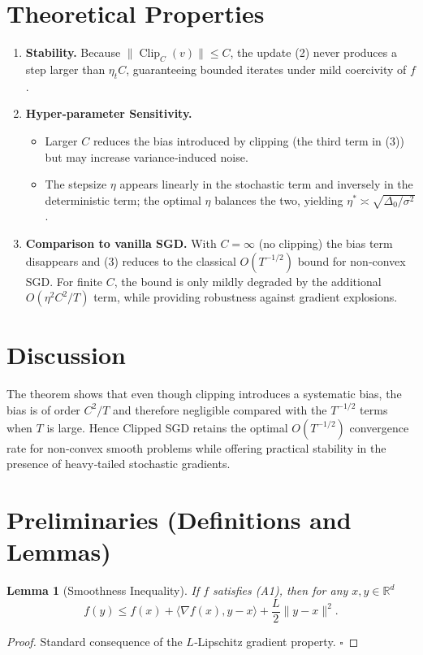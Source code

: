 \documentclass{article}
\newtheorem{lemma}{Lemma}
\newcommand{\R}{\mathbb{R}}
\begin{document}
\section*{Theoretical Properties}
\begin{enumerate}[label=\arabic*)]
\item \textbf{Stability.} Because $\|\operatorname{Clip}_{C}(v)\|\le C$, the update (2) never produces a step larger than $\eta_{t}C$, guaranteeing bounded iterates under mild coercivity of $f$.
\item \textbf{Hyper‑parameter Sensitivity.}
    \begin{itemize}
        \item Larger $C$ reduces the bias introduced by clipping (the third term in (3)) but may increase variance‑induced noise.
        \item The stepsize $\eta$ appears linearly in the stochastic term and inversely in the deterministic term; the optimal $\eta$ balances the two, yielding $\eta^{*}\asymp \sqrt{\Delta_{0}/\sigma^{2}}$.
    \end{itemize}
\item \textbf{Comparison to vanilla SGD.}
    With $C=\infty$ (no clipping) the bias term disappears and (3) reduces to the classical $O(T^{-1/2})$ bound for non‑convex SGD.  
    For finite $C$, the bound is only mildly degraded by the additional $O(\eta^{2}C^{2}/T)$ term, while providing robustness against gradient explosions.
\end{enumerate}

\section*{Discussion}
The theorem shows that even though clipping introduces a systematic bias,
the bias is of order $C^{2}/T$ and therefore negligible compared with the
$T^{-1/2}$ terms when $T$ is large.  
Hence Clipped SGD retains the optimal $O(T^{-1/2})$ convergence rate for
non‑convex smooth problems while offering practical stability in the presence
of heavy‑tailed stochastic gradients.

\newpage
\section*{Preliminaries (Definitions and Lemmas)}
\begin{lemma}[Smoothness Inequality]\label{lem:smooth}
If $f$ satisfies (A1), then for any $x,y\in\R^{d}$
\[
f(y)\le f(x)+\langle\nabla f(x),y-x\rangle+\frac{L}{2}\|y-x\|^{2}.
\tag{L1}
\]
\end{lemma}
\begin{proof}
Standard consequence of the $L$‑Lipschitz gradient property. \hfill $\square$
\end{proof}
\end{document}
